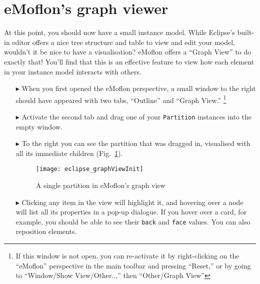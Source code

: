 \newpage
\section{eMoflon's graph viewer}
\genHeader

At this point, you should now have a small instance model. While Eclipse's built-in editor offers a nice tree structure and table to view and edit your model,
wouldn't it be nice to have a visualisation? eMoflon offers a ``Graph View'' to do exactly that! You'll find that this is an effective
feature to view how each element in your instance model interacts with others.

\begin{itemize}

\item[$\blacktriangleright$] When you first opened the eMoflon perspective, a small window to the right should have appeared with two tabs, ``Outline'' and
``Graph View.'' \footnote{If this window is not open, you can re-activate it by right-clicking on the ``eMoflon'' perspective in the main toolbar and pressing
``Reset,'' or by going to ``Window/Show View/Other..,'' then ``Other/Graph View''} 

\item[$\blacktriangleright$] Activate the second tab and drag one of your \texttt{Partition} instances into the empty window. 

\item[$\blacktriangleright$] To the right you can see the partition that was dragged in, visualised with all its immediate children
(Fig.~\ref{eclipse:graphView_init}).

\vspace{0.5cm}

\begin{figure}[htbp]
	\centering
  \texttt{[image: eclipse\_graphViewInit]}
	\caption{A single partition in eMoflon's graph view}
	\label{eclipse:graphView_init}
\end{figure}

\vspace{0.5cm}

\item[$\blacktriangleright$] Clicking any item in the view will highlight it, and hovering over a node will list all its properties in a pop-up dialogue. If you
hover over a card, for example, you should be able to see their \texttt{back} and \texttt{face} values. You can also reposition elements.

\clearpage


\end{itemize}
